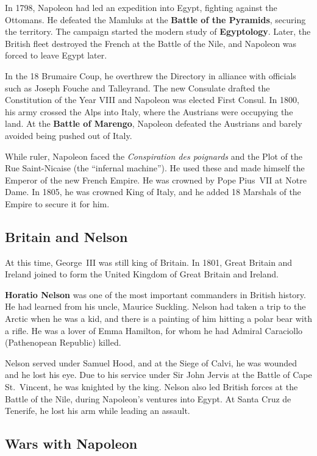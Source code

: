 In 1798, Napoleon had led an expedition into Egypt, fighting against the Ottomans.
He defeated the Mamluks at the \textbf{Battle of the Pyramids}, securing the territory.
The campaign started the modern study of \textbf{Egyptology}.
Later, the British fleet destroyed the French at the Battle of the Nile,
and Napoleon was forced to leave Egypt later.

In the 18 Brumaire Coup,
he overthrew the Directory in alliance with officials such as Joseph Fouche and Talleyrand.
The new Consulate drafted the Constitution of the Year VIII and Napoleon was elected First Consul.
In 1800, his army crossed the Alps into Italy, where the Austrians were occupying the land.
At the \textbf{Battle of Marengo},
Napoleon defeated the Austrians and barely avoided being pushed out of Italy.

While ruler, Napoleon faced the \textit{Conspiration des poignards}
and the Plot of the Rue Saint-Nicaise (the ``infernal machine'').
He used these and made himself the Emperor of the new French Empire.
He was crowned by Pope Pius~VII at Notre Dame.
In 1805, he was crowned King of Italy, and he added 18 Marshals of the Empire to secure it for him.

\subsection*{Britain and Nelson}

At this time, George~III was still king of Britain.
In 1801, Great Britain and Ireland joined to form the United Kingdom of Great Britain and Ireland.

\textbf{Horatio Nelson} was one of the most important commanders in British history.
He had learned from his uncle, Maurice Suckling.
Nelson had taken a trip to the Arctic when he was a kid,
and there is a painting of him hitting a polar bear with a rifle.
He was a lover of Emma Hamilton, for whom he had Admiral Caraciollo (Pathenopean Republic) killed.

Nelson served under Samuel Hood, and at the Siege of Calvi, he was wounded and he lost his eye.
Due to his service under Sir John Jervis at the Battle of Cape St.\ Vincent, he was knighted by the king.
Nelson also led British forces at the Battle of the Nile, during Napoleon's ventures into Egypt.
At Santa Cruz de Tenerife, he lost his arm while leading an assault.

\subsection*{Wars with Napoleon}

